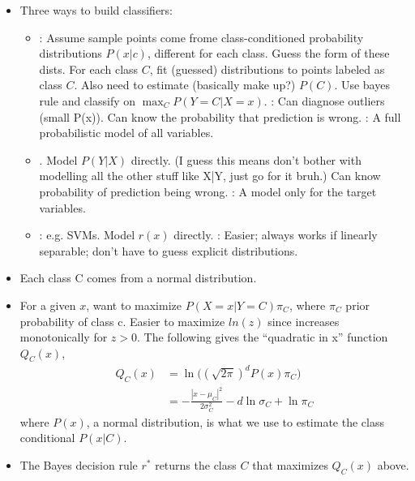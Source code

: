 \documentclass[12pt]{article}
\begin{document}
\begin{itemize}
	\item Three ways to build classifiers:
	\begin{itemize}
		\item {}: Assume sample points come frome class-conditioned probability distributions $P(x|c)$, different for each class. Guess the form of these dists. For each class $C$, fit (guessed) distributions to points labeled as class $C$. Also need to estimate (basically make up?) $P(C)$. Use bayes rule and classify on $\max_C P(Y = C|X = x)$. : Can diagnose outliers (small P(x)). Can know the probability that prediction is wrong. : A full probabilistic model of all variables.
		\item {}. Model $P(Y|X)$ directly. (I guess this means don't bother with modelling all the other stuff like X|Y, just go for it bruh.)  Can know probability of prediction being wrong. : A model only for the target variables.
		\item {}: e.g. SVMs. Model $r(x)$ directly. : Easier; always works if linearly separable; don't have to guess explicit distributions.
	\end{itemize}
\end{itemize}



\begin{itemize}
	\item {} Each class C comes from a normal distribution.
	\item For a given $x$, want to maximize $P(X = x | Y = C) \pi_C$, where $\pi_C$ prior probability of class c. Easier to maximize $ln(z)$ since increases monotonically for $z > 0$. The following gives the ``quadratic in x'' function $Q_C(x)$,
	\begin{align}
		Q_C(x)
		&= \ln \bigg( (\sqrt{2 \pi})^d P(x) \pi_C \bigg) \\
		&= -\frac{|x - \mu_C|^2}{2 \sigma_C^2} - d \ln \sigma_C + \ln \pi_C
	\end{align}
	where $P(x)$, a normal distribution, is what we use to estimate the class conditional $P(x|C)$.
	\item The Bayes decision rule $r^*$ returns the class $C$ that maximizes $Q_C(x)$ above.
\end{itemize}
\end{document}
